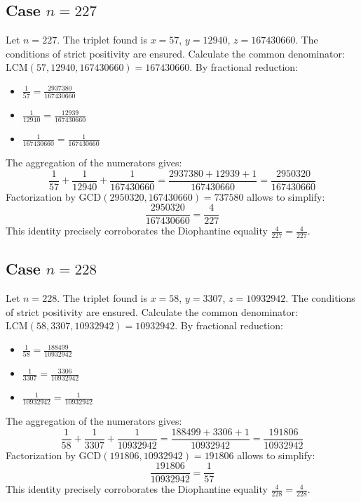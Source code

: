 \documentclass[11pt,a4paper]{article}
\begin{document}
\subsection{Case $n = 227$}
Let $n = 227$. The triplet found is $x = 57$, $y = 12940$, $z = 167430660$.
The conditions of strict positivity are ensured.
Calculate the common denominator: $\text{LCM}(57, 12940, 167430660) = 167430660$.
By fractional reduction:
\begin{itemize}
    \item $\frac{1}{57} = \frac{2937380}{167430660}$
    \item $\frac{1}{12940} = \frac{12939}{167430660}$
    \item $\frac{1}{167430660} = \frac{1}{167430660}$
\end{itemize}
The aggregation of the numerators gives:
$$ \frac{1}{57} + \frac{1}{12940} + \frac{1}{167430660} = \frac{2937380 + 12939 + 1}{167430660} = \frac{2950320}{167430660} $$
Factorization by $\text{GCD}(2950320, 167430660) = 737580$ allows to simplify:
$$ \frac{2950320}{167430660} = \frac{4}{227} $$
This identity precisely corroborates the Diophantine equality $\frac{4}{227} = \frac{4}{227}$.

\subsection{Case $n = 228$}
Let $n = 228$. The triplet found is $x = 58$, $y = 3307$, $z = 10932942$.
The conditions of strict positivity are ensured.
Calculate the common denominator: $\text{LCM}(58, 3307, 10932942) = 10932942$.
By fractional reduction:
\begin{itemize}
    \item $\frac{1}{58} = \frac{188499}{10932942}$
    \item $\frac{1}{3307} = \frac{3306}{10932942}$
    \item $\frac{1}{10932942} = \frac{1}{10932942}$
\end{itemize}
The aggregation of the numerators gives:
$$ \frac{1}{58} + \frac{1}{3307} + \frac{1}{10932942} = \frac{188499 + 3306 + 1}{10932942} = \frac{191806}{10932942} $$
Factorization by $\text{GCD}(191806, 10932942) = 191806$ allows to simplify:
$$ \frac{191806}{10932942} = \frac{1}{57} $$
This identity precisely corroborates the Diophantine equality $\frac{4}{228} = \frac{4}{228}$.
\end{document}
